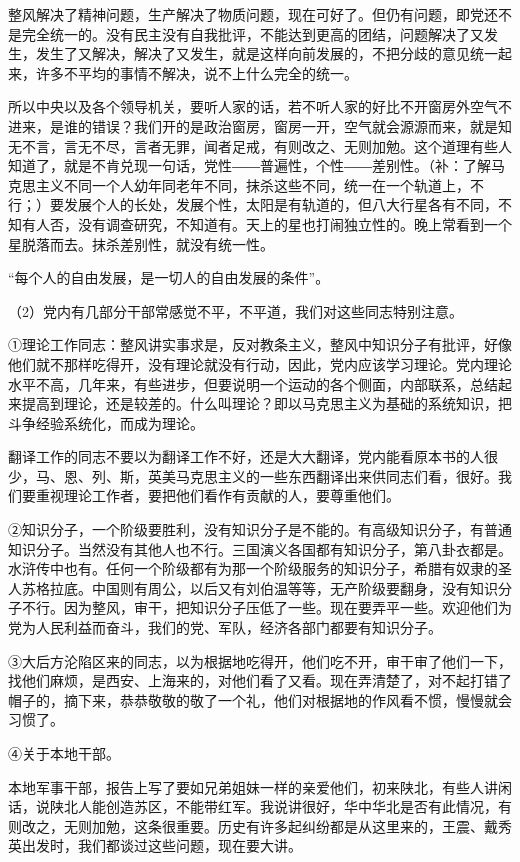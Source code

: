 整风解决了精神问题，生产解决了物质问题，现在可好了。但仍有问题，即党还不是完全统一的。没有民主没有自我批评，不能达到更高的团结，问题解决了又发生，发生了又解决，解决了又发生，就是这样向前发展的，不把分歧的意见统一起来，许多不平均的事情不解决，说不上什么完全的统一。

所以中央以及各个领导机关，要听人家的话，若不听人家的好比不开窗房外空气不进来，是谁的错误？我们开的是政治窗房，窗房一开，空气就会源源而来，就是知无不言，言无不尽，言者无罪，闻者足戒，有则改之、无则加勉。这个道理有些人知道了，就是不肯兑现一句话，党性――普遍性，个性――差别性。（补：了解马克思主义不同一个人幼年同老年不同，抹杀这些不同，统一在一个轨道上，不行；）要发展个人的长处，发展个性，太阳是有轨道的，但八大行星各有不同，不知有人否，没有调查研究，不知道有。天上的星也打闹独立性的。晚上常看到一个星脱落而去。抹杀差别性，就没有统一性。

“每个人的自由发展，是一切人的自由发展的条件”。

（2）党内有几部分干部常感觉不平，不平道，我们对这些同志特别注意。

①理论工作同志：整风讲实事求是，反对教条主义，整风中知识分子有批评，好像他们就不那样吃得开，没有理论就没有行动，因此，党内应该学习理论。党内理论水平不高，几年来，有些进步，但要说明一个运动的各个侧面，内部联系，总结起来提高到理论，还是较差的。什么叫理论？即以马克思主义为基础的系统知识，把斗争经验系统化，而成为理论。

翻译工作的同志不要以为翻译工作不好，还是大大翻译，党内能看原本书的人很少，马、恩、列、斯，英美马克思主义的一些东西翻译出来供同志们看，很好。我们要重视理论工作者，要把他们看作有贡献的人，要尊重他们。

②知识分子，一个阶级要胜利，没有知识分子是不能的。有高级知识分子，有普通知识分子。当然没有其他人也不行。三国演义各国都有知识分子，第八卦衣都是。水浒传中也有。任何一个阶级都有为那一个阶级服务的知识分子，希腊有奴隶的圣人苏格拉底。中国则有周公，以后又有刘伯温等等，无产阶级要翻身，没有知识分子不行。因为整风，审干，把知识分子压低了一些。现在要弄平一些。欢迎他们为党为人民利益而奋斗，我们的党、军队，经济各部门都要有知识分子。

③大后方沦陷区来的同志，以为根据地吃得开，他们吃不开，审干审了他们一下，找他们麻烦，是西安、上海来的，对他们看了又看。现在弄清楚了，对不起打错了帽子的，摘下来，恭恭敬敬的敬了一个礼，他们对根据地的作风看不惯，慢慢就会习惯了。

④关于本地干部。

本地军事干部，报告上写了要如兄弟姐妹一样的亲爱他们，初来陕北，有些人讲闲话，说陕北人能创造苏区，不能带红军。我说讲很好，华中华北是否有此情况，有则改之，无则加勉，这条很重要。历史有许多起纠纷都是从这里来的，王震、戴秀英出发时，我们都谈过这些问题，现在要大讲。

